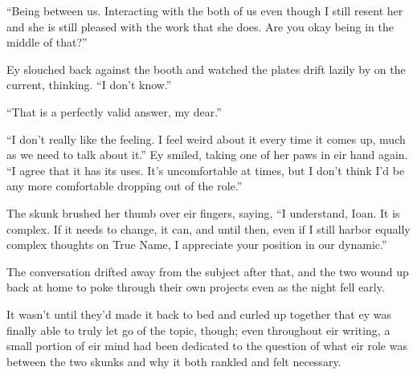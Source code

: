 ``Being between us. Interacting with the both of us even though I still resent her and she is still pleased with the work that she does. Are you okay being in the middle of that?''

Ey slouched back against the booth and watched the plates drift lazily by on the current, thinking. ``I don't know.''

``That is a perfectly valid answer, my dear.''

``I don't really like the feeling. I feel weird about it every time it comes up, much as we need to talk about it.'' Ey smiled, taking one of her paws in eir hand again. ``I agree that it has its uses. It's uncomfortable at times, but I don't think I'd be any more comfortable dropping out of the role.''

The skunk brushed her thumb over eir fingers, saying, ``I understand, Ioan. It is complex. If it needs to change, it can, and until then, even if I still harbor equally complex thoughts on True Name, I appreciate your position in our dynamic.''

The conversation drifted away from the subject after that, and the two wound up back at home to poke through their own projects even as the night fell early.

It wasn't until they'd made it back to bed and curled up together that ey was finally able to truly let go of the topic, though; even throughout eir writing, a small portion of eir mind had been dedicated to the question of what eir role was between the two skunks and why it both rankled and felt necessary.
